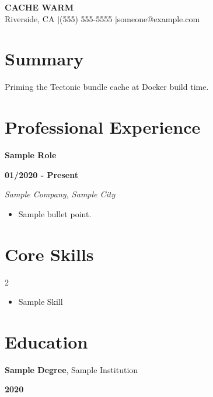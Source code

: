 \documentclass[11pt]{article}
\begin{document}
\begin{center}
  {\Large \bfseries \MakeUppercase{Cache Warm}} \\[4pt]
  \normalsize Riverside, CA \quad$\vert$\quad (555) 555-5555 \quad$\vert$\quad someone@example.com
\end{center}

\section{Summary}
Priming the Tectonic bundle cache at Docker build time.

\section{Professional Experience}
\noindent\begin{minipage}[t]{0.74\textwidth}
\textbf{Sample Role}
\end{minipage}\hfill\begin{minipage}[t]{0.22\textwidth}\raggedleft
\textbf{01/2020 - Present}
\end{minipage}\par
\textit{Sample Company, Sample City}\\[2pt]
\begin{itemize}[leftmargin=1.3em, itemsep=1pt, topsep=2pt, parsep=0pt]
  \item Sample bullet point.
\end{itemize}

\section{Core Skills}
\begin{multicols}{2}
\begin{itemize}[leftmargin=1.3em, itemsep=1pt, topsep=0pt, parsep=0pt]
  \item Sample Skill
\end{itemize}
\end{multicols}

\section{Education}
\noindent\begin{minipage}[t]{0.74\textwidth}
\textbf{Sample Degree}, Sample Institution
\end{minipage}\hfill\begin{minipage}[t]{0.22\textwidth}\raggedleft
\textbf{2020}
\end{minipage}\par
\end{document}
